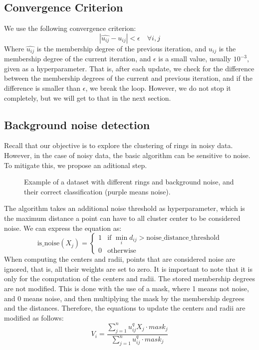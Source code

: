 \documentclass[conference]{IEEEtran}
\begin{document}
\subsection{Convergence Criterion}
We use the following convergence criterion:
\begin{equation}
|\hat{u_{ij}} - u_{ij}| < \epsilon \quad \forall i, j
\end{equation}
Where $\hat{u_{ij}}$ is the membership degree of the previous iteration, and $u_{ij}$ is the membership degree of the current iteration,
and $\epsilon$ is a small value, usually $10^{-3}$, given as a hyperparameter.
That is, after each update, we check for the difference between the membership degrees of the current and previous iteration, and if the difference is smaller than $\epsilon$,
we break the loop. However, we do not stop it completely, but we will get to that in the next section.

\subsection{Background noise detection}
Recall that our objective is to explore the clustering of rings in noisy data.
However, in the case of noisy data, the basic algorithm can be sensitive to noise. To mitigate this, we propose an aditional step.
\begin{figure}[H]
    \centering
    \resizebox{0.9\linewidth}{!}{}
    \label{fig:noisy_bg}
    \caption{Example of a dataset with different rings and background noise, and their correct classification (purple means noise).}
\end{figure}
The algorithm takes an additional noise threshold as hyperparameter, which is the maximum distance a point can have to all cluster center to be considered noise.
We can express the equation as:
\begin{equation}
    \text{is\_noise}(X_j) = \begin{cases}
        1 & \text{if } \min_{i} d_{ij} > \text{noise\_distance\_threshold} \\
        0 & \text{otherwise}
    \end{cases}
\end{equation}
When computing the centers and radii, points that are considered noise are ignored, that is, all their weights are set to zero.
It is important to note that it is only for the computation of the centers and radii. The stored membership degrees are not modified.
This is done with the use of a mask, where 1 means not noise, and 0 means noise, and then multiplying the mask by the membership degrees and the distances.
Therefore, the equations to update the centers and radii are modified as follows:
\begin{equation}\label{eq:V_i_new}
    V_i = \frac{\sum_{j=1}^{n} u_{ij}^q X_j \cdot mask_j}{\sum_{j=1}^{n} u_{ij}^q \cdot mask_j}
\end{equation}
\end{document}
